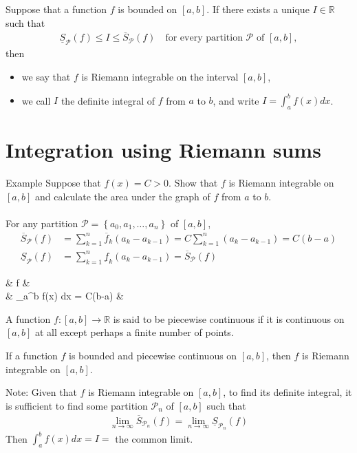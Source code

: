 \documentclass{report}
\begin{document}
			Suppose that a function $f$ is bounded on $[a,b]$. If there exists a unique $I \in \mathbb{R}$ such that
				\begin{align*}
					\underline{S}_\mathcal{P}(f) \leq I \leq \overline{S}_\mathcal{P}(f) \quad \text{for every partition $\mathcal{P}$ of } [a,b] ,
				\end{align*}
			then
			\begin{itemize}
				\item we say that $f$ is Riemann integrable on the interval $[a,b]$,
				\item we call $I$ the definite integral of $f$ from $a$ to $b$, and write $I = \displaystyle\int_a^b f(x) dx$.
			\end{itemize}

	\section{Integration using Riemann sums}

		\begin{question}{Example}
			Suppose that $f(x) = C > 0$. Show that $f$ is Riemann integrable on $[a,b]$ and calculate the area under the graph of $f$ from $a$ to $b$.
			\\ \\
			For any partition $\mathcal{P} = \left\{a_0, a_1, \dots, a_n\right\}$ of $[a,b]$,
			\begin{align*}
				\overline{S}_{\mathcal{P}}(f) &= \sum_{k=1}^n\overline{f}_k(a_k-a_{k-1}) = C\sum_{k=1}^n(a_k-a_{k-1}) = C(b-a)	\\
				\underline{S}_{\mathcal{P}}(f) &= \sum_{k=1}^n\underline{f}_k(a_k-a_{k-1}) = \overline{S}_{\mathcal{P}} (f)
			\end{align*}
			\begin{flalign*}
				& \Longrightarrow f 	&\\
				& \Longrightarrow \int_a^b f(x) dx = C(b-a)			&
			\end{flalign*}
		\end{question}

		A function $f:[a,b] \to \mathbb{R}$ is said to be piecewise continuous if it is continuous on $[a,b]$ at all except perhaps a finite number of points.

		If a function $f$ is bounded and piecewise continuous on $[a,b]$, then $f$ is Riemann integrable on $[a,b]$.

		Note: Given that $f$ is Riemann integrable on $[a,b]$, to find its definite integral, it is sufficient to find some partition $\mathcal{P}_n$ of $[a,b]$ such that
			\begin{align*}
				\lim_{n\to \infty} \overline{S}_{\mathcal{P}_n}(f) = \lim_{n\to \infty} \underline{S}_{\mathcal{P}_n}(f)
			\end{align*}
		Then $\displaystyle\int_a^bf(x)dx = I = $ the common limit.
\end{document}
